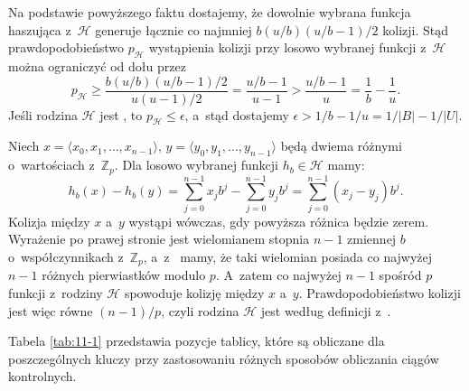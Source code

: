 Na podstawie powyższego faktu dostajemy, że dowolnie wybrana funkcja haszująca z~$\mathcal{H}$ generuje łącznie co najmniej $b(u/b)(u/b-1)/2$ kolizji.
Stąd prawdopodobieństwo $p_{\mathcal{H}}$ wystąpienia kolizji przy losowo wybranej funkcji z~$\mathcal{H}$ można ograniczyć od dołu przez
\[
	p_{\mathcal{H}} \ge \frac{b(u/b)(u/b-1)/2}{u(u-1)/2} = \frac{u/b-1}{u-1} > \frac{u/b-1}{u} = \frac{1}{b}-\frac{1}{u}.
\]
Jeśli rodzina $\mathcal{H}$ jest , to $p_{\mathcal{H}}\le\epsilon$, a~stąd dostajemy $\epsilon>1/b-1/u=1/|B|-1/|U|$.

\exercise %
Niech $x=\langle x_0,x_1,\dots,x_{n-1}\rangle$, $y=\langle y_0,y_1,\dots,y_{n-1}\rangle$ będą dwiema różnymi  o~wartościach z~$\mathbb{Z}_p$.
Dla losowo wybranej funkcji $h_b\in\mathcal{H}$ mamy:
\[
	h_b(x)-h_b(y) = \sum_{j=0}^{n-1}x_jb^j-\sum_{j=0}^{n-1}y_jb^j = \sum_{j=0}^{n-1}(x_j-y_j)b^j.
\]
Kolizja między $x$ a~$y$ wystąpi wówczas, gdy powyższa różnica będzie zerem.
Wyrażenie po prawej stronie jest wielomianem stopnia $n-1$ zmiennej $b$ o~współczynnikach z~$\mathbb{Z}_p$, a~z~ mamy, że taki wielomian posiada co najwyżej $n-1$ różnych pierwiastków modulo $p$.
A~zatem co najwyżej $n-1$ spośród $p$ funkcji z~rodziny $\mathcal{H}$ spowoduje kolizję między $x$ a~$y$.
Prawdopodobieństwo kolizji jest więc równe $(n-1)/p$, czyli rodzina $\mathcal{H}$ jest  według definicji z~.


\exercise %

\noindent Tabela \ref{tab:11-1} przedstawia pozycje tablicy, które są obliczane dla poszczególnych kluczy przy zastosowaniu różnych sposobów obliczania ciągów kontrolnych.

